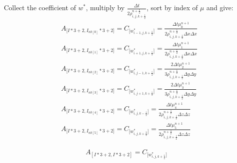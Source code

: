 \documentclass{article}
\numberwithin{equation}{subsection}
\begin{document}
Collect the coefficient of $w^*$, multiply by $\frac{\Delta t}{2 \rho^{n+\frac{1}{2}}_{i,j,k+\frac{1}{2}}}$, sort by index of $\mu$ and give:
\begin{align}
\begin{split}
& A_{\Big[I*3+2,I_{nb[0]}*3+2\Big]} = C_{\Big[w^*_{i-1,j,k+\frac{1}{2}}\Big]} = \frac{ \Delta t \mu^{n+1}_0}{2 \rho^{n+\frac{1}{2}}_{i,j,k+\frac{1}{2}} \Delta x \Delta x} \\
& A_{\Big[I*3+2,I_{nb[1]}*3+2\Big]} = C_{\Big[w^*_{i+1,j,k+\frac{1}{2}}\Big]} = \frac{ \Delta t \mu^{n+1}_1}{2 \rho^{n+\frac{1}{2}}_{i,j,k+\frac{1}{2}} \Delta x \Delta x} \\
& A_{\Big[I*3+2,I_{nb[2]}*3+2\Big]} = C_{\Big[w^*_{i,j-1,k+\frac{1}{2}}\Big]} = \frac{2\Delta t \mu^{n+1}_2}{3 \rho^{n+\frac{1}{2}}_{i,j,k+\frac{1}{2}} \Delta y \Delta y} \\
& A_{\Big[I*3+2,I_{nb[3]}*3+2\Big]} = C_{\Big[w^*_{i,j+1,k+\frac{1}{2}}\Big]} = \frac{2\Delta t \mu^{n+1}_3}{3 \rho^{n+\frac{1}{2}}_{i,j,k+\frac{1}{2}} \Delta y \Delta y} \\
& A_{\Big[I*3+2,I_{nb[4]}*3+2\Big]} = C_{\Big[w^*_{i,j,k-\frac{1}{2}}\Big]} = \frac{ \Delta t \mu^{n+1}_4}{2 \rho^{n+\frac{1}{2}}_{i,j,k+\frac{1}{2}} \Delta z \Delta z} \\
& A_{\Big[I*3+2,I_{nb[5]}*3+2\Big]} = C_{\Big[w^*_{i,j,k+\frac{3}{2}}\Big]} = \frac{ \Delta t \mu^{n+1}_5}{2 \rho^{n+\frac{1}{2}}_{i,j,k+\frac{1}{2}} \Delta z \Delta z} 
\end{split}
\end{align}

\begin{equation}
A_{[I*3+2,I*3+2]} = C_{\Big[w^*_{i,j,k+\frac{1}{2}}\Big]}
\end{equation}
\end{document}
